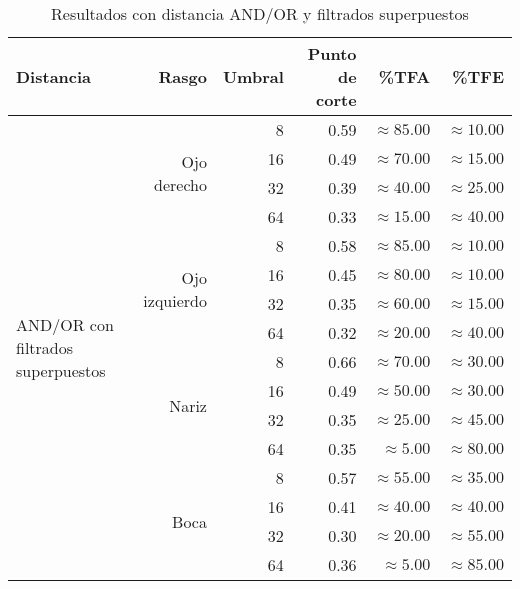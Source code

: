 \begin{table}
\begin{tabular}{|l|r|r|r|r|r|}
 \hline
  Distancia & Rasgo & Umbral & Punto de corte & \%TFA  & \%TFE \\
  \hline \hline
  \multirow{16}{*}{AND/OR con filtrados superpuestos}
& \multirow{4}{*}{Ojo derecho} & 8  & 0.59 & $\approx 85.00$ & $\approx 10.00$ \\
& & 16 & 0.49 & $\approx 70.00$ & $\approx 15.00$ \\
& & 32 & 0.39 & $\approx 40.00$ & $\approx 25.00$ \\
& & 64 & 0.33 & $\approx 15.00$ & $\approx 40.00$ \\ \cline{2-6}

& \multirow{4}{*}{Ojo izquierdo} & 8  & 0.58 & $\approx 85.00$ & $\approx 10.00$ \\
& & 16 & 0.45 & $\approx 80.00$ & $\approx 10.00$ \\
& & 32 & 0.35 & $\approx 60.00$ & $\approx 15.00$ \\
& & 64 & 0.32 & $\approx 20.00$ & $\approx 40.00$ \\ \cline{2-6}

& \multirow{4}{*}{Nariz} & 8  & 0.66 & $\approx 70.00$ & $\approx 30.00$ \\
& & 16 & 0.49 & $\approx 50.00$ & $\approx 30.00$ \\
& & 32 & 0.35 & $\approx 25.00$ & $\approx 45.00$ \\
& & 64 & 0.35 & $\approx 5.00$ & $\approx 80.00$ \\ \cline{2-6}

& \multirow{4}{*}{Boca} & 8  & 0.57 & $\approx 55.00$ & $\approx 35.00$ \\
& & 16 & 0.41 & $\approx 40.00$ & $\approx 40.00$ \\
& & 32 & 0.30 & $\approx 20.00$ & $\approx 55.00$ \\
& & 64 & 0.36 & $\approx 5.00$ & $\approx 85.00$ \\ \hline

 \end{tabular}
 \caption{Resultados con distancia AND/OR y filtrados superpuestos}
 \label{tab:and_super}
\end{table}
